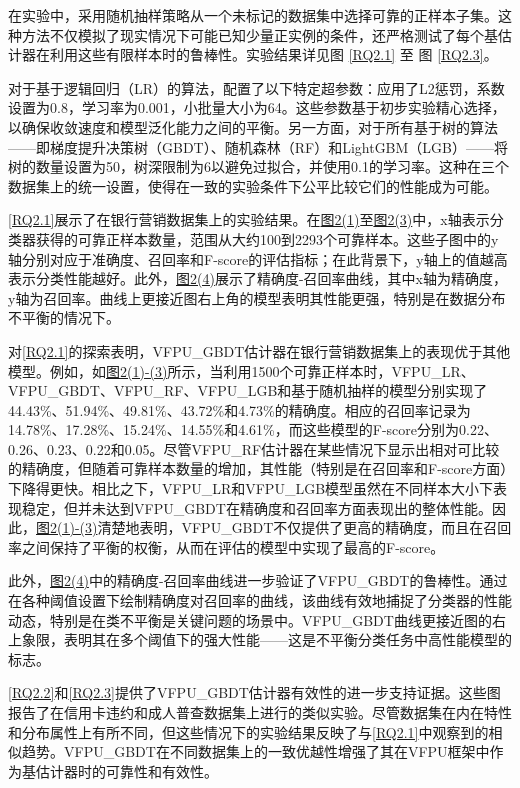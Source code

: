 在实验中，采用随机抽样策略从一个未标记的数据集中选择可靠的正样本子集。这种方法不仅模拟了现实情况下可能已知少量正实例的条件，还严格测试了每个基估计器在利用这些有限样本时的鲁棒性。实验结果详见图 \ref{RQ2.1} 至 图 \ref{RQ2.3}。

对于基于逻辑回归（LR）的算法，配置了以下特定超参数：应用了L2惩罚，系数设置为0.8，学习率为0.001，小批量大小为64。这些参数基于初步实验精心选择，以确保收敛速度和模型泛化能力之间的平衡。另一方面，对于所有基于树的算法——即梯度提升决策树（GBDT）、随机森林（RF）和LightGBM（LGB）——将树的数量设置为50，树深限制为6以避免过拟合，并使用0.1的学习率。这种在三个数据集上的统一设置，使得在一致的实验条件下公平比较它们的性能成为可能。

\autoref{RQ2.1}展示了在银行营销数据集上的实验结果。在\hyperref[RQ2.1.sub1]{图2(1)}至\hyperref[RQ2.1.sub3]{图2(3)}中，x轴表示分类器获得的可靠正样本数量，范围从大约100到2293个可靠样本。这些子图中的y轴分别对应于准确度、召回率和F-score的评估指标；在此背景下，y轴上的值越高表示分类性能越好。此外，\hyperref[RQ2.1.sub4]{图2(4)}展示了精确度-召回率曲线，其中x轴为精确度，y轴为召回率。曲线上更接近图右上角的模型表明其性能更强，特别是在数据分布不平衡的情况下。

对\autoref{RQ2.1}的探索表明，VFPU\_GBDT估计器在银行营销数据集上的表现优于其他模型。例如，如\hyperref[RQ2.1.sub1]{图2(1)-(3)}所示，当利用1500个可靠正样本时，VFPU\_LR、VFPU\_GBDT、VFPU\_RF、VFPU\_LGB和基于随机抽样的模型分别实现了44.43\%、51.94\%、49.81\%、43.72\%和4.73\%的精确度。相应的召回率记录为14.78\%、17.28\%、15.24\%、14.55\%和4.61\%，而这些模型的F-score分别为0.22、0.26、0.23、0.22和0.05。尽管VFPU\_RF估计器在某些情况下显示出相对可比较的精确度，但随着可靠样本数量的增加，其性能（特别是在召回率和F-score方面）下降得更快。相比之下，VFPU\_LR和VFPU\_LGB模型虽然在不同样本大小下表现稳定，但并未达到VFPU\_GBDT在精确度和召回率方面表现出的整体性能。因此，\hyperref[RQ2.1.sub1]{图2(1)-(3)}清楚地表明，VFPU\_GBDT不仅提供了更高的精确度，而且在召回率之间保持了平衡的权衡，从而在评估的模型中实现了最高的F-score。

此外，\hyperref[RQ2.1.sub4]{图2(4)}中的精确度-召回率曲线进一步验证了VFPU\_GBDT的鲁棒性。通过在各种阈值设置下绘制精确度对召回率的曲线，该曲线有效地捕捉了分类器的性能动态，特别是在类不平衡是关键问题的场景中。VFPU\_GBDT曲线更接近图的右上象限，表明其在多个阈值下的强大性能——这是不平衡分类任务中高性能模型的标志。

\autoref{RQ2.2}和\autoref{RQ2.3}提供了VFPU\_GBDT估计器有效性的进一步支持证据。这些图报告了在信用卡违约和成人普查数据集上进行的类似实验。尽管数据集在内在特性和分布属性上有所不同，但这些情况下的实验结果反映了与\autoref{RQ2.1}中观察到的相似趋势。VFPU\_GBDT在不同数据集上的一致优越性增强了其在VFPU框架中作为基估计器时的可靠性和有效性。


